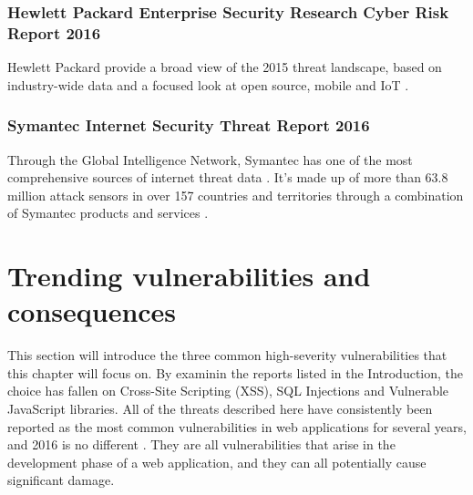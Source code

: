 \subsubsection{Hewlett Packard Enterprise Security Research Cyber Risk Report 2016}
Hewlett Packard provide a broad view of the 2015 threat landscape, based on industry-wide data and a focused look at open source, mobile and IoT \cite{HP2016}.
\subsubsection{Symantec Internet Security Threat Report 2016}
Through the Global Intelligence Network, Symantec has one of the most comprehensive sources of internet threat data \cite{Symantec2016}. It's made up of more than 63.8 million attack sensors in over 157 countries and territories through a combination of Symantec products and services \cite{Symantec2016}.
\section{Trending vulnerabilities and consequences}
This section will introduce the three common high-severity vulnerabilities that this chapter will focus on. By examinin the reports listed in the Introduction, the choice has fallen on Cross-Site Scripting (XSS), SQL Injections and Vulnerable JavaScript libraries. All of the threats described here have consistently been reported as the most common vulnerabilities in web applications for several years, and 2016 is no different \cite{OWASP2010}\cite{OWASP2013}\cite{Acunetix2016}. They are all vulnerabilities that arise in the development phase of a web application, and they can all potentially cause significant damage. 
